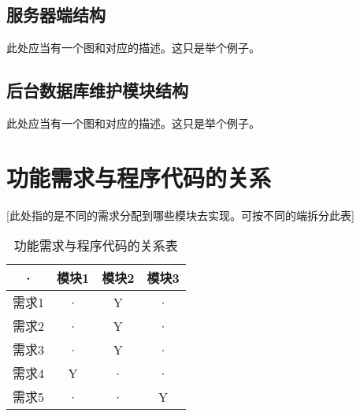 \subsection{服务器端结构}
此处应当有一个图和对应的描述。这只是举个例子。

\subsection{后台数据库维护模块结构}
此处应当有一个图和对应的描述。这只是举个例子。



\section{功能需求与程序代码的关系}
[此处指的是不同的需求分配到哪些模块去实现。可按不同的端拆分此表]
\begin{table}[htbp]
\centering
\caption{功能需求与程序代码的关系表} \label{tab:requirement-module}
\begin{tabular}{|c|c|c|c|}
    \hline
    · & 模块1 & 模块2 & 模块3 \\
    \hline
    需求1 & · & Y & · \\
    \hline
    需求2 & · & Y & · \\
    \hline
    需求3 & · & Y & · \\
    \hline
    需求4 & Y & · & · \\
    \hline
    需求5 & · & · & Y \\
    \hline
\end{tabular}
\end{table}